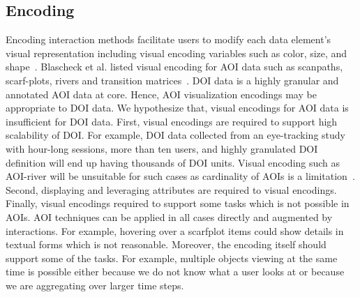 \subsection{Encoding}
\label{sec:Encoding}
Encoding interaction methods facilitate users to modify each data element's visual representation including visual encoding variables such as color, size, and shape~\cite{yi2007toward}. Blascheck et al. listed visual encoding for AOI data such as scanpaths, scarf-plots, rivers and transition matrices~\cite{blascheck2014state}. DOI data is a highly granular and annotated AOI data at core. Hence, AOI visualization encodings may be appropriate to DOI data. We hypothesize that, visual encodings for AOI data is insufficient for DOI data. First, visual encodings are required to support high scalability of DOI. For example, DOI data collected from an eye-tracking study with hour-long sessions, more than ten users, and highly granulated DOI definition will end up having thousands of DOI units. Visual encoding such as AOI-river will be unsuitable for such cases as cardinality of AOIs is a limitation~\cite{burch2013aoi}. Second, displaying and leveraging attributes are required to visual encodings. Finally, visual encodings required to support some tasks which is not possible in AOIs. AOI techniques can be applied in all cases directly and augmented by interactions. For example, hovering over a scarfplot items could show details in textual forms which is not reasonable. Moreover, the encoding itself should support some of the tasks. For example, multiple objects viewing at the same time is possible either because we do not know what a user looks at or because we are aggregating over larger time steps.

